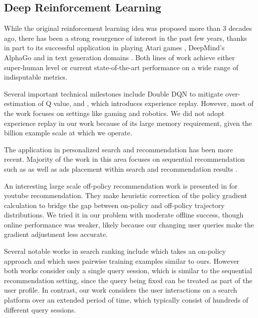 \subsection{Deep Reinforcement Learning}
\label{subsec:rw:rl}

While the original reinforcement learning idea was proposed more than 3 decades ago, there has been a strong resurgence of interest in the past few years, thanks in part to its successful application in playing Atari games \cite{mnih2013playing}, DeepMind's AlphaGo \cite{silver2017mastering} and in text generation domains \cite{chen2019reinforcement,gong2019reinforcement}. Both lines of work achieve either super-human level or current state-of-the-art performance on a wide range of indisputable metrics.  

Several important technical milestones include Double DQN \cite{van2016deep} to mitigate over-estimation of Q value, and \cite{schaul2015prioritized}, which introduces experience replay. However, most of the work focuses on settings like gaming and robotics. We did not adopt experience replay in our work because of its large memory requirement, given the billion example scale at which we operate. 

The application in personalized search and recommendation has been more recent. Majority of the work in this area focuses on sequential recommendation such as \cite{zhao2018deep} as well as ads placement within search and recommendation results \cite{zhao2021dear}.

An interesting large scale off-policy recommendation work is presented in \cite{chen2019top} for youtube recommendation. They make heuristic correction of the policy gradient calculation to bridge the gap between on-policy and off-policy trajectory distributions. We tried it in our problem with moderate offline success, though online performance was weaker, likely because our changing user queries make the gradient adjustment less accurate.

Several notable works in search ranking include \cite{hu2018reinforcement} which takes an on-policy approach and \cite{xu2020reinforcement} which uses pairwise training examples similar to ours. However both works consider only a single query session, which is similar to the sequential recommendation setting, since the query being fixed can be treated as part of the user profile. In contrast, our work considers the user interactions on a search platform over an extended period of time, which typically consist of hundreds of different query sessions. 




